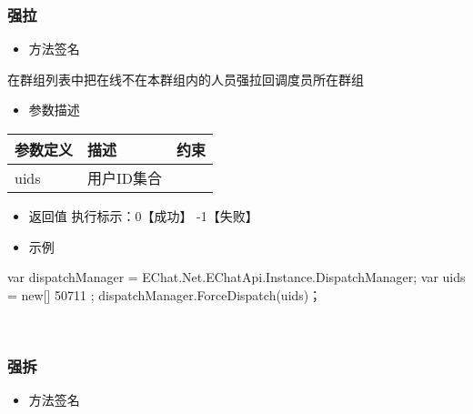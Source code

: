 \documentclass[letterpaper,10pt,english]{sphinxmanual}
\begin{document}
\subsubsection{强拉}
\label{\detokenize{csharp:id72}}\begin{itemize}
\item {} 
方法签名

\end{itemize}

在群组列表中把在线不在本群组内的人员强拉回调度员所在群组

%
\begin{sphinxVerbatim}[commandchars=\\\{\}]
  \PYG{p}{[}\PYG{p}{]} 
\end{sphinxVerbatim}
\begin{itemize}
\item {} 
参数描述

\end{itemize}


\begin{savenotes}\sphinxattablestart
\centering
\begin{tabulary}{\linewidth}[t]{|T|T|T|}
\hline
\sphinxstyletheadfamily 
参数定义
&\sphinxstyletheadfamily 
描述
&\sphinxstyletheadfamily 
约束
\\
\hline
uids
&
用户ID集合
&
\textendash{}
\\
\hline
\end{tabulary}
\par
\sphinxattableend\end{savenotes}
\begin{itemize}
\item {} 
返回值 执行标示：0【成功】 -1【失败】

\item {} 
示例

\end{itemize}

%
\begin{sphinxVerbatim}[commandchars=\\\{\}]
var \PYGZus{}dispatchManager = EChat.Net.EChatApi.Instance.DispatchManager;
var uids = new[] \PYGZob{} 50711 \PYGZcb{};
\PYGZus{}dispatchManager.ForceDispatch(uids)；
\end{sphinxVerbatim}

​


\subsubsection{强拆}
\label{\detokenize{csharp:id73}}\begin{itemize}
\item {} 
方法签名

\end{itemize}
\end{document}
